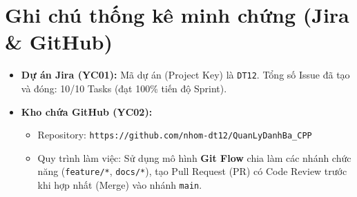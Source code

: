 \documentclass[12pt,a4paper]{report}
\begin{document}
\section*{Ghi chú thống kê minh chứng (Jira \& GitHub)}
\begin{itemize}
    \item \textbf{Dự án Jira (YC01):} Mã dự án (Project Key) là \texttt{DT12}. Tổng số Issue đã tạo và đóng: 10/10 Tasks (đạt 100\% tiến độ Sprint).
    \item \textbf{Kho chứa GitHub (YC02):}
    \begin{itemize}
        \item Repository: \texttt{https://github.com/nhom-dt12/QuanLyDanhBa\_CPP}
        \item Quy trình làm việc: Sử dụng mô hình \textbf{Git Flow} chia làm các nhánh chức năng (\texttt{feature/*}, \texttt{docs/*}), tạo Pull Request (PR) có Code Review trước khi hợp nhất (Merge) vào nhánh \texttt{main}.
    \end{itemize}
\end{itemize}
\end{document}
